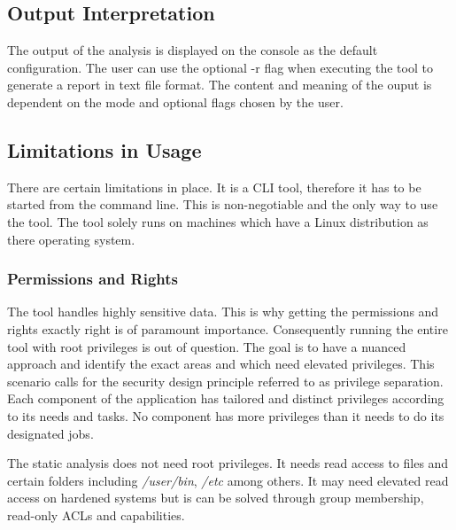 \subsection{Output Interpretation}

The output of the analysis is displayed on the console as the default configuration. The user can use the optional -r flag when executing the tool to generate a report in text file format. \newline The content and meaning of the ouput is dependent on the mode and optional flags chosen by the user. 


\subsection{Limitations in Usage}

There are certain limitations in place. It is a CLI tool, therefore it has to be started from the command line. This is non-negotiable and the only way to use the tool. \newline The tool solely runs on machines which have a Linux distribution as there operating system.

\subsubsection{Permissions and Rights}

The tool handles highly sensitive data. This is why getting the permissions and rights exactly right is of paramount importance. Consequently running the entire tool with root privileges is out of question. The goal is to have a nuanced approach and identify the exact areas and which need elevated privileges. This scenario calls for the security design principle referred to as privilege separation. Each component of the application has tailored and distinct privileges according to its needs and tasks. No component has more privileges than it needs to do its designated jobs.\newline 

The static analysis does not need root privileges. It needs read access to files and certain folders including \textit{/user/bin}, \textit{/etc} among others. It may need elevated read access on hardened systems but is can be solved through group membership, read-only ACLs and capabilities.\newline 

